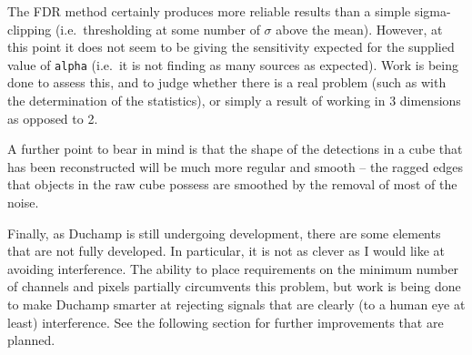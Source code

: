 \documentclass[12pt,a4paper]{article}
\newcommand{\ie}{i.e.\ }
\begin{document}
The FDR method certainly produces more reliable results than a simple
sigma-clipping (\ie thresholding at some number of $\sigma$ above the
mean). However, at this point it does not seem to be giving the
sensitivity expected for the supplied value of {\tt alpha} (\ie it is
not finding as many sources as expected). Work is
being done to assess this, and to judge whether there is a real
problem (such as with the determination of the statistics), or simply
a result of working in 3 dimensions as opposed to 2.

A further point to bear in mind is that the shape of the detections in
a cube that has been reconstructed will be much more regular and
smooth -- the ragged edges that objects in the raw cube possess are
smoothed by the removal of most of the noise.

Finally, as Duchamp is still undergoing development, there are some
elements that are not fully developed. In particular, it is not as
clever as I would like at avoiding interference. The ability to place
requirements on the minimum number of channels and pixels partially
circumvents this problem, but work is being done to make Duchamp
smarter at rejecting signals that are clearly (to a human eye at
least) interference. See the following section for further
improvements that are planned.

%
%
%
%
%
%
%
\end{document}
